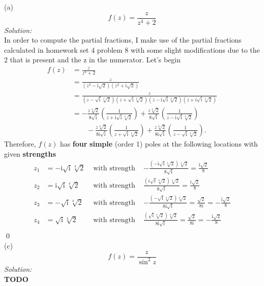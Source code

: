 \documentclass[10pt]{amsart}
\newcommand{\I}{\mathrm{i}}
\theoremstyle{nonumberplain}
\begin{document}
\begin{enumerate}[label={\bf {\arabic*}:}]
\noindent
(a)
$$
f(z) = \frac z {z^4 + 2}
$$
\textit{Solution:} \\
In order to compute the partial fractions, I make use of the partial fractions calculated in homework set 4 problem 8 with some slight modifications due to the 2 that is present and the z in the numerator.
Let's begin
\begin{align*}
f(z) &= \frac z {z^4 + 2} \\
	&= \frac z {(z^2 - \I\sqrt{2})(z^2 + \I\sqrt{2})} \\
	&= \frac z {
		(z - \sqrt{\I}\sqrt[4]{2})
		(z + \sqrt{\I}\sqrt[4]{2})
		(z - \I\sqrt{\I}\sqrt[4]{2})
		(z + \I\sqrt{\I}\sqrt[4]{2})
	} \\
	&= - \frac {z \sqrt[4]2} {8\sqrt{\I}} \left( \frac{1}{z + \I\sqrt{\I} \sqrt[4]{2}} \right)
		+ \frac {z \sqrt[4]2} {8\sqrt{\I}} \left(\frac{1}{z - \I\sqrt{\I} \sqrt[4]{2}} \right) \\
		& \quad \quad - \frac {z \sqrt[4]2} {8\I\sqrt{\I}} \left( \frac{1}{z + \sqrt{\I} \sqrt[4]{2}} \right)
		+ \frac {z \sqrt[4]2} {8\I\sqrt{\I}} \left( \frac{1}{z - \sqrt{\I} \sqrt[4]{2}} \right).
\end{align*}
Therefore, $f(z)$ has { \bf four}  { \bf simple } (order 1) poles at the following locations with given { \bf strengths }
\begin{align*}
z_1 &= - \I\sqrt{\I} \sqrt[4]{2}
	& \text{ with strength }
	& - \frac {\left( - \I\sqrt{\I} \sqrt[4]{2} \right) \sqrt[4]2} {8\sqrt{\I}}
		= \frac {\I \sqrt{2} } {8} \\
z_2 &= \I\sqrt{\I} \sqrt[4]{2}
	& \text{ with strength }
	& \frac {\left( i\sqrt{i} \sqrt[4]{2} \right) \sqrt[4]2} {8\sqrt{i}}
		= \frac {i \sqrt{2} } {8} \\
z_3 &= - \sqrt{\I} \sqrt[4]{2}
	& \text{ with strength }
	& - \frac {\left(- \sqrt{\I} \sqrt[4]{2} \right) \sqrt[4]2} {8 \I\sqrt{\I}}
		= \frac {\sqrt{2} } {8 \I} 
		= - \frac { \I \sqrt{2} } {8} \\
z_4 &= \sqrt{\I} \sqrt[4]{2}
	& \text{ with strength }
	& \frac {\left(\sqrt{\I} \sqrt[4]{2} \right) \sqrt[4]2} {8 \I \sqrt{\I}}
		= \frac {\sqrt{2} } {8 \I} 
		= - \frac { \I \sqrt{2} } {8} \\
\end{align*} \qed \\

\noindent
(c)
$$
f(z) = \frac z {\sin^2 z}
$$
\textit{Solution:} \\
\textbf{TODO} \\


\end{enumerate}
\end{document}
